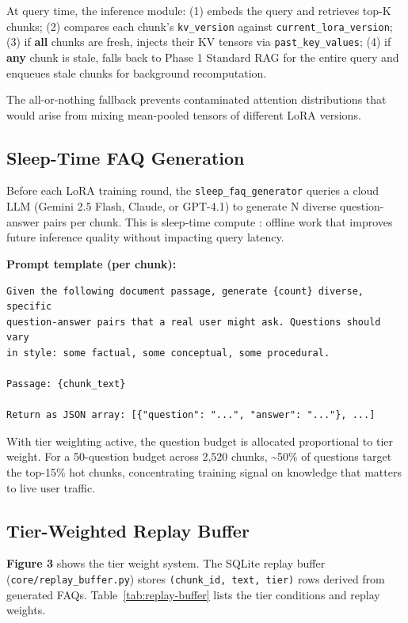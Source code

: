 \documentclass[10pt,twocolumn]{article}
\begin{document}
At query time, the inference module: (1) embeds the query and retrieves top-K chunks; (2) compares each chunk's \texttt{kv\_version} against \texttt{current\_lora\_version}; (3) if \textbf{all} chunks are fresh, injects their KV tensors via \texttt{past\_key\_values}; (4) if \textbf{any} chunk is stale, falls back to Phase 1 Standard RAG for the entire query and enqueues stale chunks for background recomputation.


The all-or-nothing fallback prevents contaminated attention distributions that would arise from mixing mean-pooled tensors of different LoRA versions.


\subsection{Sleep-Time FAQ Generation}

Before each LoRA training round, the \texttt{sleep\_faq\_generator} queries a cloud LLM (Gemini 2.5 Flash, Claude, or GPT-4.1) to generate N diverse question-answer pairs per chunk. This is sleep-time compute \cite{ref14}: offline work that improves future inference quality without impacting query latency.


\textbf{Prompt template (per chunk):}


\begin{lstlisting}
Given the following document passage, generate {count} diverse, specific
question-answer pairs that a real user might ask. Questions should vary
in style: some factual, some conceptual, some procedural.

Passage: {chunk_text}

Return as JSON array: [{"question": "...", "answer": "..."}, ...]
\end{lstlisting}

With tier weighting active, the question budget is allocated proportional to tier weight. For a 50-question budget across 2,520 chunks, \textasciitilde{}50\% of questions target the top-15\% hot chunks, concentrating training signal on knowledge that matters to live user traffic.


\subsection{Tier-Weighted Replay Buffer}

\textbf{Figure 3} shows the tier weight system. The SQLite replay buffer (\texttt{core/replay\_buffer.py}) stores \texttt{(chunk\_id, text, tier)} rows derived from generated FAQs. Table~\ref{tab:replay-buffer} lists the tier conditions and replay weights.
\end{document}
